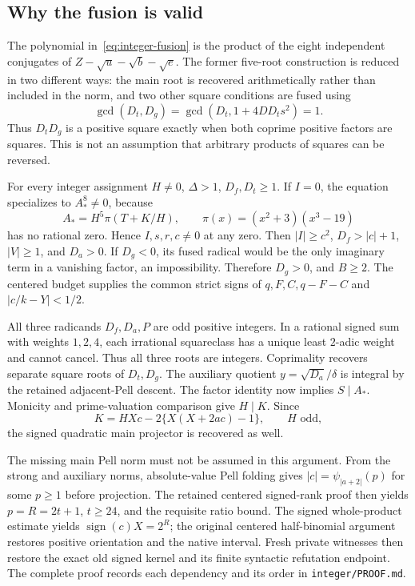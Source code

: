 \subsection{Why the fusion is valid}
The polynomial in~\eqref{eq:integer-fusion} is the product of the eight
independent conjugates of $Z-\sqrt u-\sqrt b-\sqrt e$.
The former five-root construction is reduced in two different ways:
the main root is recovered arithmetically rather than included in the norm,
and two other square conditions are fused using
\[
 \gcd(D_t,D_g)=\gcd(D_t,1+4DD_t s^2)=1.
\]
Thus $D_tD_g$ is a positive square exactly when both coprime positive
factors are squares. This is not an assumption that arbitrary products of
squares can be reversed.

For every integer assignment $H\ne0$, $\Delta>1$, $D_f,D_t\ge1$.
If $I=0$, the equation specializes to $A_*^8\ne0$, because
\[
 A_*=H^5\pi(T+K/H),\qquad \pi(x)=(x^2+3)(x^3-19)
\]
has no rational zero. Hence $I,s,r,c\ne0$ at any zero.
Then $|I|\ge c^2$, $D_f>|c|+1$, $|V|\ge1$, and $D_a>0$.
If $D_g<0$, its fused radical would be the only imaginary term in a
vanishing factor, an impossibility. Therefore $D_g>0$, and $B\ge2$.
The centered budget supplies the common strict signs of $q,F,C,q-F-C$
and $|c/k-Y|<1/2$.

All three radicands $D_f,D_a,P$ are odd positive integers. In a rational
signed sum with weights $1,2,4$, each irrational squareclass has a unique
least $2$-adic weight and cannot cancel. Thus all three roots are integers.
Coprimality recovers separate square roots of $D_t,D_g$.
The auxiliary quotient $y=\sqrt{D_a}/\delta$ is integral by the retained
adjacent-Pell descent. The factor identity now implies $S\mid A_*$.
Monicity and prime-valuation comparison give $H\mid K$. Since
\[
 K=HXc-2\{X(X+2ac)-1\},\qquad H\text{ odd},
\]
the signed quadratic main projector is recovered as well.

The missing main Pell norm must not be assumed in this argument.
From the strong and auxiliary norms, absolute-value Pell folding gives
$|c|=\psi_{|a+2|}(p)$ for some $p\ge1$ before projection.
The retained centered signed-rank proof then yields $p=R=2t+1$, $t\ge24$,
and the requisite ratio bound. The signed whole-product estimate yields
$\operatorname{sign}(c)X=2^R$; the original centered half-binomial argument
restores positive orientation and the native interval. Fresh private
witnesses then restore the exact old signed kernel and its finite
syntactic refutation endpoint. The complete proof records each dependency
and its order in \texttt{integer/PROOF.md}.

